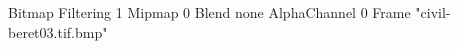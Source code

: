 {Bitmap
	{Filtering 1}
	{Mipmap 0}
	{Blend none}
	{AlphaChannel 0}
	{Frame "civil-beret03.tif.bmp"}
}
